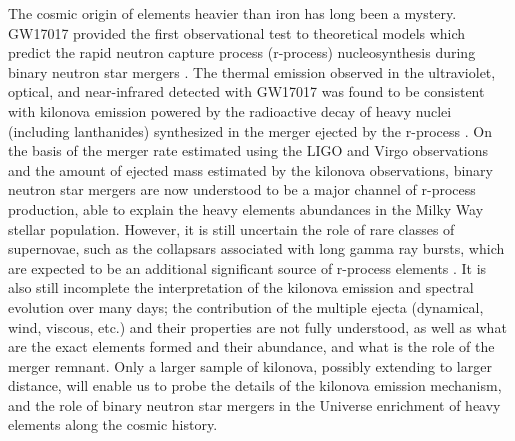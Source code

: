 The cosmic origin of elements heavier than iron has long been a mystery. 
GW17017 provided the first observational test to theoretical models which predict the rapid neutron capture process (r-process) nucleosynthesis during  binary neutron star mergers \citep[see e.g.,][]{Metzger2017,Kasen:2017,Tanaka2016}. 
The thermal emission observed in the ultraviolet, optical, and near-infrared detected with GW17017 was found to be consistent with kilonova emission powered by the radioactive decay of heavy nuclei (including lanthanides) synthesized in the merger ejected by the r-process \citep[see e.g.,][]{Pian:2017,Smartt:2017,Evans:2017}.  
On the basis of the merger rate estimated using the LIGO and Virgo observations and the amount of ejected mass estimated by the kilonova observations, binary neutron star mergers are now understood to be a major channel of r-process production, able to explain the heavy elements abundances in the Milky Way stellar population. However, it is still uncertain the role of rare classes of supernovae, such as the collapsars associated with long gamma ray bursts, which are expected to be an additional significant source of r-process elements \cite{Siegel2019}.
It is also still incomplete the interpretation of the kilonova emission and spectral evolution over many days; the contribution of the multiple ejecta (dynamical, wind, viscous, etc.) and their properties are not fully understood, as well as what are the exact elements formed and their abundance, and what is the role of the merger remnant. Only a larger sample of kilonova, possibly extending to larger distance, will enable us to probe the details of the kilonova emission mechanism, and the role of binary neutron star mergers in the Universe enrichment of heavy elements along the cosmic history.

